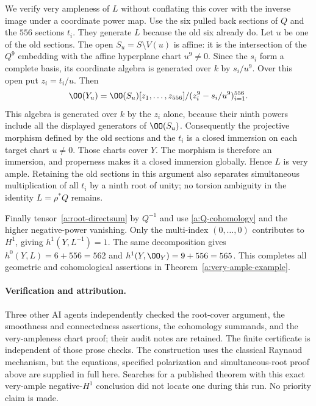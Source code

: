 We verify very ampleness of $L$ without conflating this cover with
the inverse image under a coordinate power map. Use the six pulled
back sections of $Q$ and the $556$ sections $t_i$. They generate $L$
because the old six already do. Let $u$ be one of the old sections.
The open $S_u=S\setminus V(u)$ is affine: it is the intersection of
the $Q^9$ embedding with the affine hyperplane chart $u^9\ne0$.
Since the $s_i$ form a complete basis, its coordinate algebra is
generated over $k$ by $s_i/u^9$. Over this open put $z_i=t_i/u$.
Then
\[
 \OO(Y_u)=\OO(S_u)[z_1,\ldots,z_{556}]
                   /(z_i^9-s_i/u^9)_{i=1}^{556}.
\]
This algebra is generated over $k$ by the $z_i$ alone, because their
ninth powers include all the displayed generators of $\OO(S_u)$.
Consequently the projective morphism defined by the old sections and
the $t_i$ is a closed immersion on each target chart $u\ne0$.
Those charts cover $Y$. The morphism is therefore an immersion,
and properness makes it a closed immersion globally. Hence $L$ is
very ample. Retaining the old sections in this argument also
separates simultaneous multiplication of all $t_i$ by a ninth root
of unity; no torsion ambiguity in the identity $L=\rho^*Q$ remains.

Finally tensor~\eqref{a:root-directsum} by $Q^{-1}$ and use
\eqref{a:Q-cohomology} and the higher negative-power vanishing.
Only the multi-index $(0,\ldots,0)$ contributes to $H^1$, giving
$h^1(Y,L^{-1})=1$. The same decomposition gives
$h^0(Y,L)=6+556=562$ and $h^1(Y,\OO_Y)=9+556=565$.
This completes all geometric and cohomological assertions in
Theorem~\ref{a:very-ample-example}.

\paragraph{Verification and attribution.}
Three other AI agents independently checked the root-cover argument,
the smoothness and connectedness assertions, the cohomology summands,
and the very-ampleness chart proof; their audit notes are retained.
The finite certificate is independent of those prose checks. The
construction uses the classical Raynaud mechanism, but the equations,
specified polarization and simultaneous-root proof above are supplied
in full here. Searches for a published theorem with this exact
very-ample negative-$H^1$ conclusion did not locate one during this
run. No priority claim is made.

